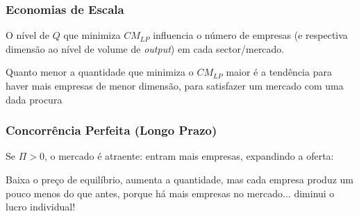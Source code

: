 \begin{frame}
	\frametitle{Economias de Escala}
	O n\'ivel de $Q$ que minimiza $CM_{LP}$ influencia o n\'umero de empresas (e respectiva dimens\~ao ao n\'ivel de volume de \emph{output}) em cada sector/mercado.

	\vspace{0.5cm}

	Quanto menor a quantidade que minimiza o $CM_{LP}$ maior \'e a tend\^encia para haver mais empresas de menor dimens\~ao, para satisfazer um mercado com uma dada procura

\end{frame}

\begin{frame}
	\frametitle{Concorr\^encia Perfeita (Longo Prazo)}
	Se $\Pi>0$, o mercado \'e atraente: entram mais empresas, expandindo a oferta:
	\begin{center}
	\end{center}
	Baixa o pre\c co de equil\'ibrio, aumenta a quantidade, mas cada empresa produz um pouco menos do que antes, porque h\'a mais empresas no mercado... diminui o lucro individual!
\end{frame}

